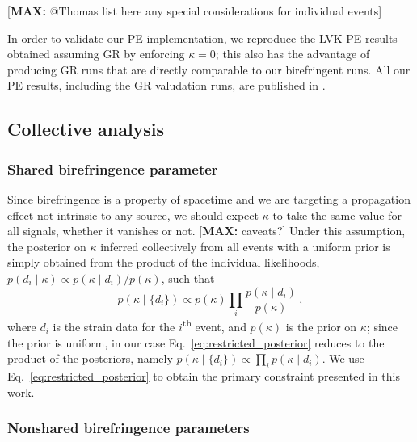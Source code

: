 \documentclass[aps,prd,twocolumn,superscriptaddress,preprintnumbers,floatfix,nofootinbib]{revtex4-2}
\newcommand*{\mi}[1]{\textsf{\color{magenta} [\textbf{MAX:} #1]}}
\begin{document}
\mi{@Thomas list here any special considerations for individual events}

In order to validate our \ac{PE} implementation, we reproduce the \ac{LVK} \ac{PE} results obtained assuming \ac{GR} by enforcing $\kappa = 0$; this also has the advantage of producing \ac{GR} runs that are directly comparable to our birefringent runs.
All our \ac{PE} results, including the \ac{GR} valudation runs, are published in \citet{dataset}.

\subsection{Collective analysis}

\subsubsection{Shared birefringence parameter}

Since birefringence is a property of spacetime and we are targeting a propagation effect not intrinsic to any source, we should expect $\kappa$ to take the same value for all signals, whether it vanishes or not.
\mi{caveats?}
Under this assumption, the posterior on $\kappa$ inferred collectively from all events with a uniform prior is simply obtained from the product of the individual likelihoods, $p(d_i \mid \kappa) \propto p(\kappa \mid d_i)/p(\kappa)$, such that
\begin{equation}
    p(\kappa \mid \{d_i\})\propto p(\kappa) \prod_{i}\frac{p(\kappa \mid d_i)}{p(\kappa)}\,,
    \label{eq:restricted_posterior}
\end{equation}
where $d_i$ is the strain data for the $i$\textsuperscript{th} event, and $p(\kappa)$ is the prior on $\kappa$; since the prior is uniform, in our case Eq.~\eqref{eq:restricted_posterior} reduces to the product of the posteriors, namely $p(\kappa \mid \{d_i\}) \propto \prod_{i}p(\kappa \mid d_i)$.
We use Eq.~\eqref{eq:restricted_posterior} to obtain the primary constraint presented in this work.

\subsubsection{Nonshared birefringence parameters}
\end{document}
